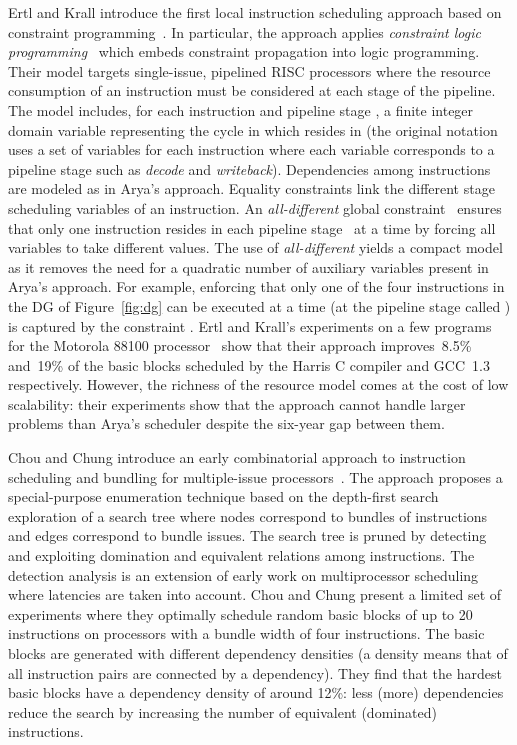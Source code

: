 \documentclass[acmsmall,authorversion,nonacm]{acmart}
\newcommand{\var}[2]{}
\begin{document}
Ertl and Krall introduce the first local instruction scheduling
approach based on constraint programming~\cite{Ertl1991}.
In particular, the approach applies \emph{constraint logic
  programming}~\cite{Jaffar1987} which embeds constraint propagation
into logic programming.
Their model targets single-issue, pipelined RISC processors where the
resource consumption of an instruction must be considered at each
stage of the pipeline.
The model includes, for each instruction  and pipeline stage , a
finite integer domain variable \var{s}{i,k} representing the cycle in
which  resides in  (the original notation uses a set of
variables  for each instruction  where each
variable corresponds to a pipeline stage such as \emph{decode} and
\emph{writeback}).
Dependencies among instructions are modeled as in Arya's approach.
Equality constraints link the different stage scheduling variables of
an instruction.
An \emph{all-different} global constraint~\cite{CPH:global} ensures
that only one instruction resides in each pipeline stage~ at a time
by forcing all variables  to take
different values.
The use of \emph{all-different} yields a compact model as it removes
the need for a quadratic number of auxiliary variables present in
Arya's approach.
For example, enforcing that only one of the four instructions in the
DG of Figure~\ref{fig:dg} can be executed at a time (at the pipeline
stage called ) is captured by the constraint
.
Ertl and Krall's experiments on a few programs for the Motorola 88100
processor~\cite{Alsup1990} show that their approach improves~8.5\%
and~19\% of the basic blocks scheduled by the Harris C compiler and
GCC~1.3~\cite{GCC2017} respectively.
However, the richness of the resource model comes at the cost of low
scalability: their experiments show that the approach cannot handle
larger problems than Arya's scheduler despite the six-year gap between
them.

Chou and Chung introduce an early combinatorial approach to
instruction scheduling and bundling for multiple-issue
processors~\cite{Chou1995}.
The approach proposes a special-purpose enumeration technique based on
the depth-first search exploration of a search tree where nodes
correspond to bundles of instructions and edges correspond to bundle
issues.
The search tree is pruned by detecting and exploiting domination and
equivalent relations among instructions.
The detection analysis is an extension of early work on multiprocessor
scheduling~\cite{Ramamoorthy1972} where latencies are taken into
account.
Chou and Chung present a limited set of experiments where they
optimally schedule random basic blocks of up to 20 instructions on
processors with a bundle width of four instructions.
The basic blocks are generated with different dependency densities (a
density  means that  of all instruction pairs are connected by
a dependency).
They find that the hardest basic blocks have a dependency density of
around 12\%: less (more) dependencies reduce the search by
increasing the number of equivalent (dominated) instructions.
\end{document}
